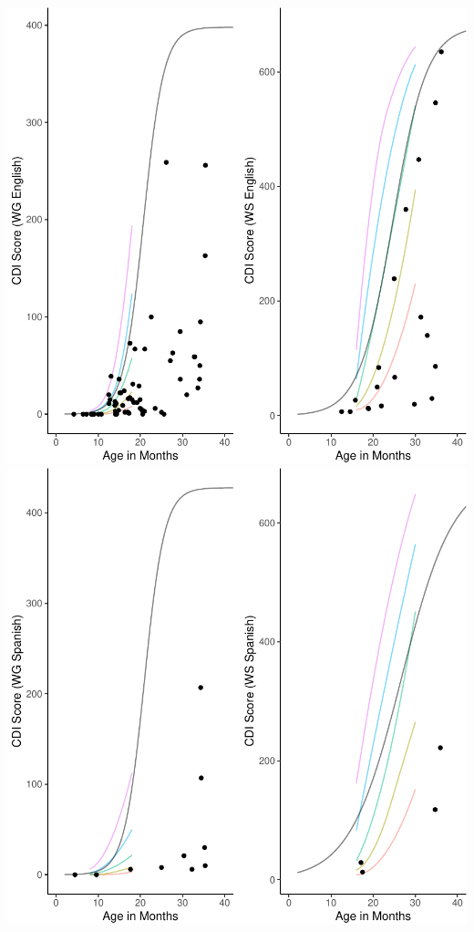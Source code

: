 \documentclass[english,man]{apa6}
\begin{document}
\includegraphics{ELSSP_paper_files/figure-latex/wg-ws-rainbow-plot-1.pdf} \includegraphics{ELSSP_paper_files/figure-latex/wg-ws-rainbow-plot-2.pdf}
\end{document}
